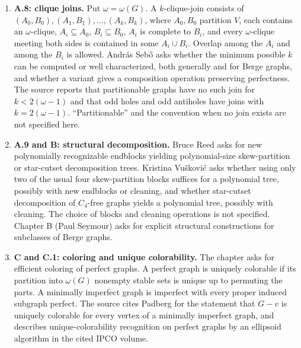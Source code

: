 \documentclass[11pt]{article}
\begin{document}
\begin{enumerate}
\item \textbf{A.8: clique joins.} Put $\omega=\omega(G)$. A $k$-clique-join consists of $(A_0,B_0),(A_1,B_1),\ldots,(A_k,B_k)$, where $A_0,B_0$ partition $V$, each contains an $\omega$-clique, $A_i\subseteq A_0$, $B_i\subseteq B_0$, $A_i$ is complete to $B_i$, and every $\omega$-clique meeting both sides is contained in some $A_i\cup B_i$. Overlap among the $A_i$ and among the $B_i$ is allowed. Andr\'as Seb\H{o} asks whether the minimum possible $k$ can be computed or well characterized, both generally and for Berge graphs, and whether a variant gives a composition operation preserving perfectness. The source reports that partitionable graphs have no such join for $k<2(\omega-1)$ and that odd holes and odd antiholes have joins with $k=2(\omega-1)$. ``Partitionable'' and the convention when no join exists are not specified here.
\item \textbf{A.9 and B: structural decomposition.} Bruce Reed asks for new polynomially recognizable endblocks yielding polynomial-size skew-partition or star-cutset decomposition trees. Kristina Vu\v{s}kovi\'c asks whether using only two of the usual four skew-partition blocks suffices for a polynomial tree, possibly with new endblocks or cleaning, and whether star-cutset decomposition of $C_4$-free graphs yields a polynomial tree, possibly with cleaning. The choice of blocks and cleaning operations is not specified. Chapter B (Paul Seymour) asks for explicit structural constructions for subclasses of Berge graphs.
\item \textbf{C and C.1: coloring and unique colorability.} The chapter asks for efficient coloring of perfect graphs. A perfect graph is uniquely colorable if its partition into $\omega(G)$ nonempty stable sets is unique up to permuting the parts. A minimally imperfect graph is imperfect with every proper induced subgraph perfect. The source cites Padberg for the statement that $G-v$ is uniquely colorable for every vertex of a minimally imperfect graph, and describes unique-colorability recognition on perfect graphs by an ellipsoid algorithm in the cited IPCO volume.


\end{enumerate}
\end{document}
